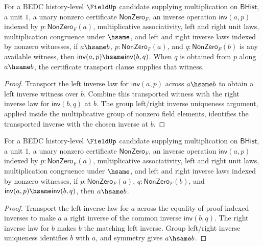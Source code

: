 \begin{theorem}
\label{thm:field-inverse-congruence-from-apartness}
For a BEDC history-level $\FieldUp$ candidate supplying multiplication on $\mathsf{BHist}$, a unit $1$, a unary nonzero certificate $\mathsf{NonZero}_F$, an inverse operation $\mathsf{inv}(a,p)$ indexed by $p:\mathsf{NonZero}_F(a)$, multiplicative associativity, left and right unit laws, multiplication congruence under $\hsame$, and left and right inverse laws indexed by nonzero witnesses, if $a\hsame b$, $p:\mathsf{NonZero}_F(a)$, and $q:\mathsf{NonZero}_F(b)$ is any available witness, then $\mathsf{inv}(a,p)\hsame\mathsf{inv}(b,q)$. When $q$ is obtained from $p$ along $a\hsame b$, the certificate transport clause supplies that witness.
\end{theorem}
\begin{proof}
Transport the left inverse law for $\mathsf{inv}(a,p)$ across $a\hsame b$ to obtain a left inverse witness over $b$. Combine this transported witness with the right inverse law for $\mathsf{inv}(b,q)$ at $b$. The group left/right inverse uniqueness argument, applied inside the multiplicative group of nonzero field elements, identifies the transported inverse with the chosen inverse at $b$.
\end{proof}

\begin{theorem}
\label{thm:field-inverse-cancel-from-apartness}
For a BEDC history-level $\FieldUp$ candidate supplying multiplication on
$\mathsf{BHist}$, a unit $1$, a unary nonzero certificate
$\mathsf{NonZero}_F$, an inverse operation $\mathsf{inv}(a,p)$ indexed by
$p:\mathsf{NonZero}_F(a)$, multiplicative associativity, left and right unit
laws, multiplication congruence under $\hsame$, and left and right inverse
laws indexed by nonzero witnesses, if $p:\mathsf{NonZero}_F(a)$,
$q:\mathsf{NonZero}_F(b)$, and
$\mathsf{inv}(a,p)\hsame\mathsf{inv}(b,q)$, then $a\hsame b$.
\end{theorem}
\begin{proof}
Transport the left inverse law for $a$ across the equality of
proof-indexed inverses to make $a$ a right inverse of the common inverse
$\mathsf{inv}(b,q)$. The right inverse law for $b$ makes $b$ the
matching left inverse. Group left/right inverse uniqueness identifies $b$
with $a$, and symmetry gives $a\hsame b$.
\end{proof}


